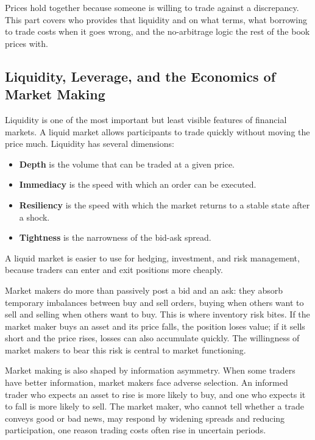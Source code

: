 \documentclass[../ai_in_finance]{subfiles}
\begin{document}
Prices hold together because someone is willing to trade against a discrepancy. This part covers who provides that liquidity and on what terms, what borrowing to trade costs when it goes wrong, and the no-arbitrage logic the rest of the book prices with.

\subsection{Liquidity, Leverage, and the Economics of Market Making}
\label{sec:market-making}

Liquidity is one of the most important but least visible features of financial markets. A liquid market allows participants to trade quickly without moving the price much. Liquidity has several dimensions:

\begin{itemize}
    \item \textbf{Depth} is the volume that can be traded at a given price.
    \item \textbf{Immediacy} is the speed with which an order can be executed.
    \item \textbf{Resiliency} is the speed with which the market returns to a stable state after a shock.
    \item \textbf{Tightness} is the narrowness of the bid-ask spread.
\end{itemize}

A liquid market is easier to use for hedging, investment, and risk management, because traders can enter and exit positions more cheaply.

Market makers do more than passively post a bid and an ask: they absorb temporary imbalances between buy and sell orders, buying when others want to sell and selling when others want to buy. This is where inventory risk bites. If the market maker buys an asset and its price falls, the position loses value; if it sells short and the price rises, losses can also accumulate quickly. The willingness of market makers to bear this risk is central to market functioning.

Market making is also shaped by information asymmetry. When some traders have better information, market makers face adverse selection. An informed trader who expects an asset to rise is more likely to buy, and one who expects it to fall is more likely to sell. The market maker, who cannot tell whether a trade conveys good or bad news, may respond by widening spreads and reducing participation, one reason trading costs often rise in uncertain periods.
\end{document}
